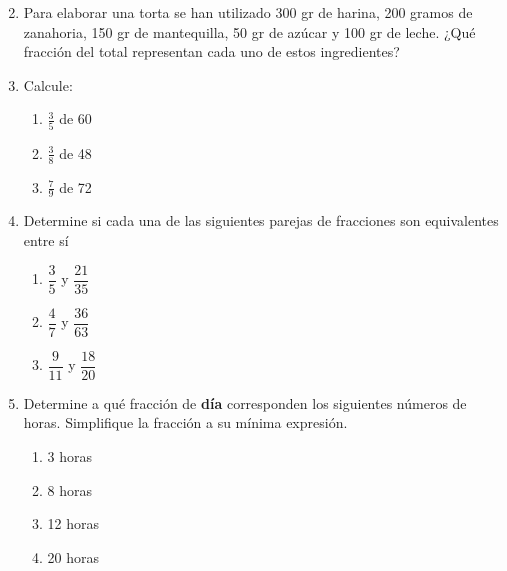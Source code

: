 \documentclass[fleqn]{article}
\begin{document}
\begin{enumerate}
\begin{enumerate}
\begin{multicols}{3}
 \end{multicols}
 \end{enumerate}
 \item Para elaborar una torta se han utilizado 300 gr de harina, 200 gramos de zanahoria, 150 gr de mantequilla, 50 gr de azúcar y 100 gr de leche. ¿Qué fracción del total representan cada uno de estos ingredientes?\noanswer
 \newpage
 \item Calcule:
 \begin{enumerate}
 \item $\frac{3}{5}$ de 60 \noanswer
 \item $\frac{3}{8}$ de 48 \noanswer
 \item $\frac{7}{9}$ de 72 \noanswer
 \end{enumerate}
 \item Determine si cada una de las siguientes parejas de fracciones son equivalentes entre sí
 \begin{enumerate}
 \item $\dfrac{3}{5}$ y $\dfrac{21}{35}$ \noanswer
 \item $\dfrac{4}{7}$ y $\dfrac{36}{63}$ \noanswer
 \item $\dfrac{9}{11}$ y $\dfrac{18}{20}$ \noanswer
 \end{enumerate}
 \item Determine a qué fracción de \textbf{día} corresponden los siguientes números de horas. Simplifique la fracción a su mínima expresión.
 \begin{enumerate}
 \item 3 horas \noanswer
 \item 8 horas \noanswer
 \item 12 horas \noanswer
 \item 20 horas \noanswer
 \end{enumerate}
 \end{enumerate}
\end{document}
